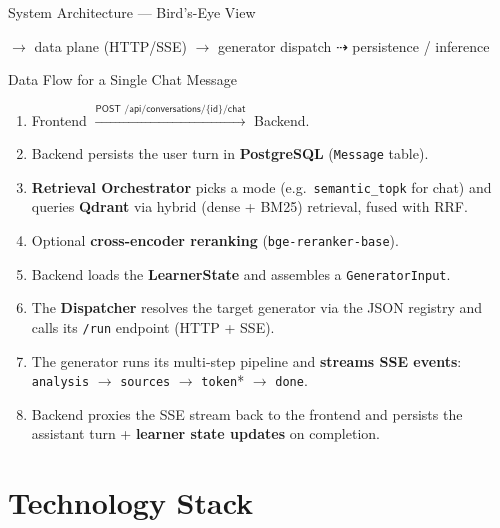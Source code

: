 \documentclass[aspectratio=169, 10pt]{beamer}
\begin{document}
\begin{frame}{System Architecture --- Bird's-Eye View}

  \vspace{0.15cm}
  \footnotesize
  \textcolor{eduBlue}{$\rightarrow$ data plane (HTTP/SSE)} \quad
  \textcolor{eduGreen}{$\rightarrow$ generator dispatch} \quad
  \textcolor{eduOrange}{$\dashrightarrow$ persistence / inference}
\end{frame}

\begin{frame}{Data Flow for a Single Chat Message}
  \scriptsize
  \begin{enumerate}
    \item Frontend $\xrightarrow{\textsf{POST /api/conversations/\{id\}/chat}}$ Backend.
    \item Backend persists the user turn in \textbf{PostgreSQL} (\texttt{Message} table).
    \item \textbf{Retrieval Orchestrator} picks a mode (e.g.\ \texttt{semantic\_topk} for chat)
          and queries \textbf{Qdrant} via hybrid (dense + BM25) retrieval, fused with RRF.
    \item Optional \textbf{cross-encoder reranking} (\texttt{bge-reranker-base}).
    \item Backend loads the \textbf{LearnerState} and assembles a \texttt{GeneratorInput}.
    \item The \textbf{Dispatcher} resolves the target generator via the JSON registry and
          calls its \texttt{/run} endpoint (HTTP + SSE).
    \item The generator runs its multi-step pipeline and \textbf{streams SSE events}:
          \texttt{analysis} $\to$ \texttt{sources} $\to$ \texttt{token}* $\to$ \texttt{done}.
    \item Backend proxies the SSE stream back to the frontend and persists the
          assistant turn + \textbf{learner state updates} on completion.
  \end{enumerate}
\end{frame}

\section{Technology Stack}
\end{document}
